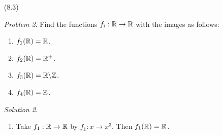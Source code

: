 \documentclass[12pt]{book}
\newcommand{\com}[2]{#1\backslash#2}
\theoremstyle{plain}
\theoremstyle{plain} %
\theoremstyle{definition}
\theoremstyle{remark}
\newtheorem*{remark}{Remark}
\newtheorem*{problem}{Problem}
\newtheorem*{solution}{Solution}
\begin{document}
\begin{enumerate}
\begin{problem}
                List the elements of the set $\{x \in \R:f \circ g(x)=g \circ f(x)\}$.
        \end{problem} 
        \begin{solution}
            Let $f,g:\R \rightarrow \R$ be defined by $f:x \rightarrow x^3$ and  $g:x
            \rightarrow 1-x$. Then  $f \circ f=f^2:\R \rightarrow \R$ is defined by  $f^2:x \rightarrow
            x^2 \rightarrow (x^3)^3=x^9$. $f \circ g:\R \rightarrow \R$ is defined by  $f \circ g:x
            \rightarrow 1-x \rightarrow (1-x)^3=(1-x)(1-x)(1-x)=(1-2x+x^2)(1-x)=x^3-x^2$. 
            $g \circ f:\R \rightarrow \R$ is defined by $g \circ f:x 
            \rightarrow x^3 \rightarrow 1-x^3$, and finally  $g \circ g=g^2:\R \rightarrow \R$ 
            is defined by  $g^2:x \rightarrow 1-x \rightarrow 1-(1-x)=x$.

            Now consider $f \circ g$ and  $g \circ f$, when is  $f \circ g=g \circ f$? Consider
            $x^3-x^2=1-x^3$. Then $x^2+1=0$, which has no solutions in $\R$. So $f \circ g \neq g
            \circ f$ for all  $x \in \R$.
        \end{solution}
        \begin{remark} 
            The second part of this problem may be misconstrued, as in my copy of the book it says
            to list all the elements of the set $\{x \in \R:fg(x)=gf(x)\}$; which may mean something
            different than function composition for some authors. However, it is most likely that
            composition is implied by that notation since in general $g \circ f \neq f \circ g$,
            moreover it is a popular algebraic notation to express composition by $fg$ instead of
            $f \circ g$.
        \end{remark}

    \item[(8.3)]\begin{problem}
                Find the functions $f_i:\mathbb{R} \rightarrow \mathbb{R}$ with the images as follows:
                    \begin{enumerate}[label=(\arabic*)]
                        \item $ f_1(\mathbb{R})=\mathbb{R}$.
                
                        \item $f_2(\mathbb{R})=\mathbb{R}^+$.

                        \item $f_3(\R)=\com{\R}{\Z}$.

                        \item $f_4(\mathbb{R})=\mathbb{Z}$.
                    \end{enumerate}
            \end{problem}
            \begin{solution}
                \begin{enumerate}[label=(\arabic*)]
                    \item Take $f_1:\mathbb{R} \rightarrow \mathbb{R}$ by $ f_1:x \rightarrow x^3$. Then $ f_1(\mathbb{R})=\mathbb{R}$.		


\end{enumerate}
\end{solution}
\end{enumerate}
\end{document}
